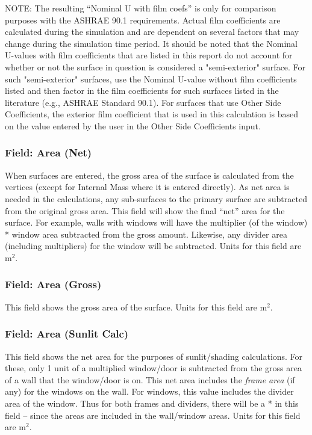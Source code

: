 NOTE: The resulting ``Nominal U with film coefs'' is only for comparison purposes with the ASHRAE 90.1 requirements. Actual film coefficients are calculated during the simulation and are dependent on several factors that may change during the simulation time period.  It should be noted that the Nominal U-values with film coefficients that are listed in this report do not account for whether or not the surface in question is considered a "semi-exterior" surface. For such "semi-exterior" surfaces, use the Nominal U-value without film coefficients listed and then factor in the film coefficients for such surfaces listed in the literature (e.g., ASHRAE Standard 90.1).  For surfaces that use Other Side Coefficients, the exterior film coefficient that is used in this calculation is based on the value entered by the user in the Other Side Coefficients input.

\subsubsection{Field: Area (Net)}\label{field-area-net}

When surfaces are entered, the gross area of the surface is calculated from the vertices (except for Internal Mass where it is entered directly). As net area is needed in the calculations, any sub-surfaces to the primary surface are subtracted from the original gross area. This field will show the final ``net'' area for the surface. For example, walls with windows will have the multiplier (of the window) * window area subtracted from the gross amount. Likewise, any divider area (including multipliers) for the window will be subtracted. Units for this field are m\(^{2}\).

\subsubsection{Field: Area (Gross)}\label{field-area-gross}

This field shows the gross area of the surface. Units for this field are m\(^{2}\).

\subsubsection{Field: Area (Sunlit Calc)}\label{field-area-sunlit-calc}

This field shows the net area for the purposes of sunlit/shading calculations. For these, only 1 unit of a multiplied window/door is subtracted from the gross area of a wall that the window/door is on. This net area includes the \emph{frame area} (if any) for the windows on the wall. For windows, this value includes the divider area of the window. Thus for both frames and dividers, there will be a * in this field -- since the areas are included in the wall/window areas. Units for this field are m\(^{2}\).

